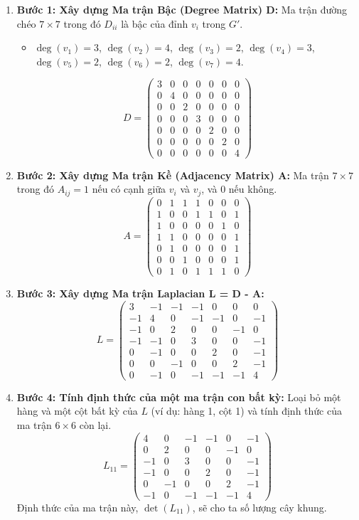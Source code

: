\documentclass[a4paper,12pt]{article}
\begin{document}
\begin{enumerate}
    \item \textbf{Bước 1: Xây dựng Ma trận Bậc (Degree Matrix) D:}
    Ma trận đường chéo $7 \times 7$ trong đó $D_{ii}$ là bậc của đỉnh $v_i$ trong $G'$.
    \begin{itemize}
        \item $\deg(v_1)=3$, $\deg(v_2)=4$, $\deg(v_3)=2$, $\deg(v_4)=3$, $\deg(v_5)=2$, $\deg(v_6)=2$, $\deg(v_7)=4$.
    \end{itemize}
    \[ D = \begin{pmatrix}
    3 & 0 & 0 & 0 & 0 & 0 & 0 \\
    0 & 4 & 0 & 0 & 0 & 0 & 0 \\
    0 & 0 & 2 & 0 & 0 & 0 & 0 \\
    0 & 0 & 0 & 3 & 0 & 0 & 0 \\
    0 & 0 & 0 & 0 & 2 & 0 & 0 \\
    0 & 0 & 0 & 0 & 0 & 2 & 0 \\
    0 & 0 & 0 & 0 & 0 & 0 & 4
    \end{pmatrix} \]

    \item \textbf{Bước 2: Xây dựng Ma trận Kề (Adjacency Matrix) A:}
    Ma trận $7 \times 7$ trong đó $A_{ij}=1$ nếu có cạnh giữa $v_i$ và $v_j$, và 0 nếu không.
    \[ A = \begin{pmatrix}
    0&1&1&1&0&0&0 \\ 1&0&0&1&1&0&1 \\ 1&0&0&0&0&1&0 \\ 1&1&0&0&0&0&1 \\ 0&1&0&0&0&0&1 \\ 0&0&1&0&0&0&1 \\ 0&1&0&1&1&1&0
    \end{pmatrix} \]

    \item \textbf{Bước 3: Xây dựng Ma trận Laplacian L = D - A:}
    \[ L = \begin{pmatrix}
    3&-1&-1&-1&0&0&0 \\ -1&4&0&-1&-1&0&-1 \\ -1&0&2&0&0&-1&0 \\ -1&-1&0&3&0&0&-1 \\ 0&-1&0&0&2&0&-1 \\ 0&0&-1&0&0&2&-1 \\ 0&-1&0&-1&-1&-1&4
    \end{pmatrix} \]

    \item \textbf{Bước 4: Tính định thức của một ma trận con bất kỳ:}
    Loại bỏ một hàng và một cột bất kỳ của $L$ (ví dụ: hàng 1, cột 1) và tính định thức của ma trận $6 \times 6$ còn lại.
    \[ L_{11} = \begin{pmatrix}
    4&0&-1&-1&0&-1 \\ 0&2&0&0&-1&0 \\ -1&0&3&0&0&-1 \\ -1&0&0&2&0&-1 \\ 0&-1&0&0&2&-1 \\ -1&0&-1&-1&-1&4
    \end{pmatrix} \]
    Định thức của ma trận này, $\det(L_{11})$, sẽ cho ta số lượng cây khung.
    

\end{enumerate}
\end{document}
